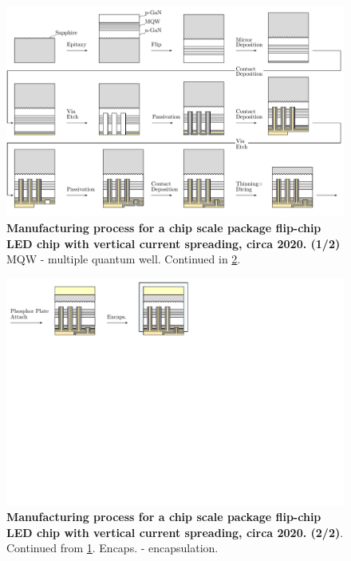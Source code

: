 \documentclass[parskip=full]{article}
\begin{document}

    \begin{landscape}
        \begin{figure}
            \includegraphics[width=595pt]{./figures/csp_overview_2020-1.pdf}
            \caption{\textbf{Manufacturing process for a chip scale package flip-chip LED chip with vertical current spreading, circa 2020. (1/2)} MQW - multiple quantum well. Continued in \cref{fig:manuf_csp_2020-2}.}
            \label{fig:manuf_csp_2020-1}
        \end{figure}
    \end{landscape}

    \begin{landscape}
        \begin{figure}
            \includegraphics[width=595pt]{./figures/csp_overview_2020-2.pdf}
            \caption{\textbf{Manufacturing process for a chip scale package flip-chip LED chip with vertical current spreading, circa 2020. (2/2)}. Continued from \cref{fig:manuf_csp_2020-1}. Encaps. - encapsulation.}
            \label{fig:manuf_csp_2020-2}
        \end{figure}
    \end{landscape}
\end{document}
